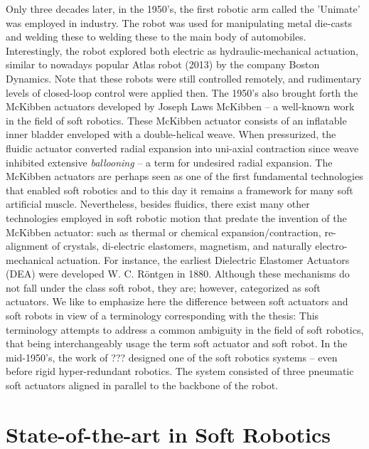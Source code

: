 Only three decades later, in the 1950's, the first robotic arm called the 'Unimate' was employed in industry. The robot was used for manipulating metal die-casts and welding these to welding these to the main body of automobiles. Interestingly, the robot explored both electric as hydraulic-mechanical actuation, similar to nowadays popular Atlas robot (2013) by the company Boston Dynamics. Note that these robots were still controlled remotely, and rudimentary levels of closed-loop control were applied then. The 1950's also brought forth the McKibben actuators developed by Joseph Laws McKibben -- a well-known work in the field of soft robotics. These McKibben actuator consists of an inflatable inner bladder enveloped with a double-helical weave. When pressurized, the fluidic actuator converted radial expansion into uni-axial contraction since weave inhibited extensive \emph{ballooning} -- a term for undesired radial expansion. The McKibben actuators are perhaps seen as one of the first fundamental technologies that enabled soft robotics and to this day it remains a framework for many soft artificial muscle. Nevertheless, besides fluidics, there exist many other technologies employed in soft robotic motion that predate the invention of the McKibben actuator: such as thermal or chemical expansion/contraction, re-alignment of crystals, di-electric elastomers, magnetism, and naturally electro-mechanical actuation. For instance, the earliest Dielectric Elastomer Actuators (DEA) were developed W. C. R\"{o}ntgen in 1880. Although these mechanisms do not fall under the class soft robot, they are; however, categorized as soft actuators. We like to emphasize here the difference between soft actuators and soft robots in view of a terminology corresponding with the thesis:
%
%
\noindent This terminology attempts to address a common ambiguity in the field of soft robotics, that being interchangeably usage the term soft actuator and soft robot. In the mid-1950's, the work of ??? designed one of the soft robotics systems -- even before rigid hyper-redundant robotics. The system consisted of three pneumatic soft actuators aligned in parallel to the backbone of the robot.

\section{State-of-the-art in Soft Robotics}

